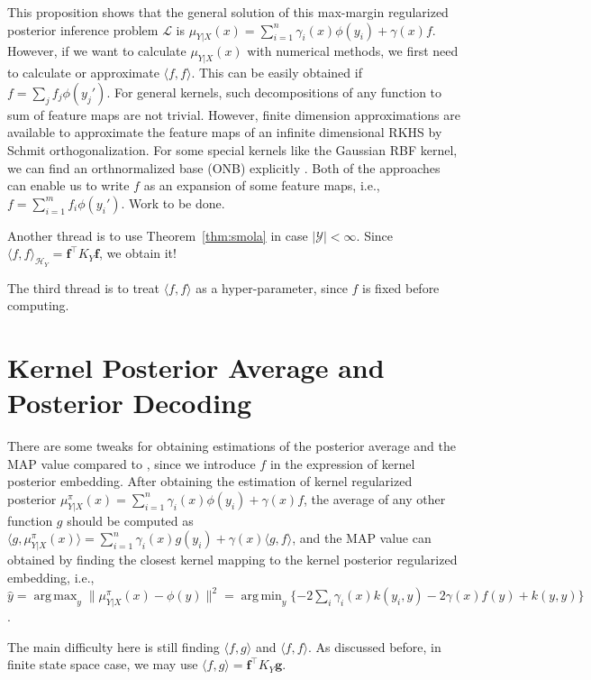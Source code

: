 \documentclass[a4paper]{article}
\renewcommand{\bf}{\mathbf}
\renewcommand{\cal}{\mathcal}
\newcommand{\T}{\intercal}
\DeclareMathOperator*{\argmin}{arg\,min}
\DeclareMathOperator*{\argmax}{arg\,max}
\newcommand{\thmref}[1]{Theorem~\ref{#1}}
\begin{document}
This proposition shows that the general solution of this max-margin regularized posterior inference problem $\cal{L}$ is $\mu_{Y|X}(x) = \sum_{i=1}^n \gamma_i(x) \phi(y_i) + \gamma(x) f$. However, if we want to calculate $\mu_{Y|X}(x)$ with numerical methods, we first need to calculate or approximate $\langle f,f \rangle$. This can be easily obtained if $f = \sum_j f_j\phi(y_j')$. For general kernels, such decompositions of any function to sum of feature maps are not trivial. However, finite dimension approximations \cite{rahimi2007random}\cite{oliva2015bayesian} are available to approximate the feature maps of an infinite dimensional RKHS by Schmit orthogonalization. For some special kernels like the Gaussian RBF kernel, we can find an orthnormalized base (ONB) explicitly \cite{steinwart2006explicit}. Both of the approaches can enable us to write $f$ as an expansion of some feature maps, i.e., $f = \sum_{i=1}^{m} f_i\phi(y_i')$. {\color{red} Work to be done.} 

Another thread is to use \thmref{thm:smola} in case $|\cal{Y}| < \infty$. Since $\langle f, f\rangle_{\cal{H}_Y} = \bf{f}^\T K_Y \bf{f}$, we obtain it! 

The third thread is to treat $\langle f,f\rangle$ as a hyper-parameter, since $f$ is fixed before computing.

\section{Kernel Posterior Average and Posterior Decoding}
There are some tweaks for obtaining estimations of the posterior average and the MAP value compared to \cite{song2013kernel}, since we introduce $f$ in the expression of kernel posterior embedding. After obtaining the estimation of kernel regularized posterior $\mu_{Y|X}^\pi(x) = \sum_{i=1}^n \gamma_i(x) \phi(y_i) + \gamma(x) f$, the average of any other function $g$ should be computed as $\langle g, \mu_{Y|X}^\pi(x)\rangle = \sum_{i=1}^{n} \gamma_i(x)g(y_i) + \gamma(x) \langle g,f\rangle$, and the MAP value can obtained by finding the closest kernel mapping to the kernel posterior regularized embedding, i.e., $\hat{y} = \argmax_{y} \|\mu_{Y|X}^\pi(x) - \phi(y)\|^2 = \argmin_{y} \{ %
- 2\sum_i\gamma_i(x)k(y_i,y) - 2\gamma(x)f(y) + k(y,y)\}$. 

The main difficulty here is still finding $\langle f,g\rangle$ and $\langle f,f\rangle$. As discussed before, in finite state space case, we may use $\langle f,g\rangle = \bf{f}^\T K_Y \bf{g}$.
\end{document}
